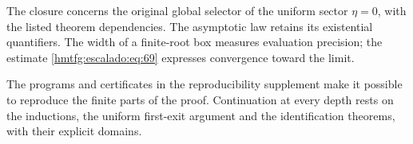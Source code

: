 The closure concerns the original global selector of the uniform sector \(\eta=0\), with the listed theorem dependencies. The asymptotic law retains its existential quantifiers. The width of a finite-root box measures evaluation precision; the estimate \eqref{hmtfg:escalado:eq:69} expresses convergence toward the limit.


The programs and certificates in the reproducibility supplement make it possible to reproduce the finite parts of the proof. Continuation at every depth rests on the inductions, the uniform first-exit argument and the identification theorems, with their explicit domains.
